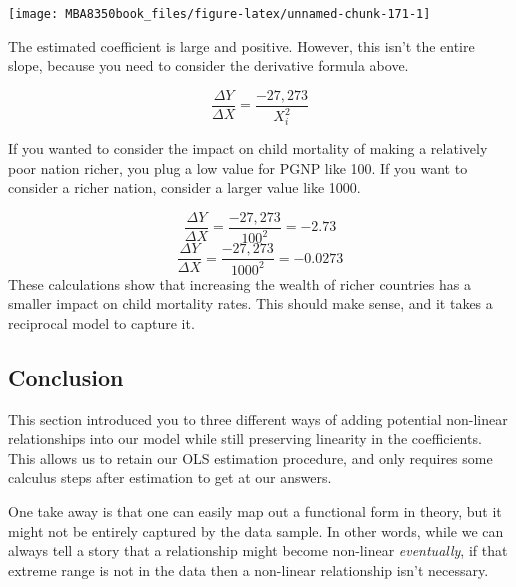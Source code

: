 \documentclass[
]{book}
\newenvironment{Shaded}{\begin{snugshade}}{\end{snugshade}}
\newcommand{\AttributeTok}[1]{\textcolor[rgb]{0.77,0.63,0.00}{#1}}
\newcommand{\FunctionTok}[1]{\textcolor[rgb]{0.00,0.00,0.00}{#1}}
\newcommand{\NormalTok}[1]{#1}
\newcommand{\SpecialCharTok}[1]{\textcolor[rgb]{0.00,0.00,0.00}{#1}}
\newcommand{\StringTok}[1]{\textcolor[rgb]{0.31,0.60,0.02}{#1}}
\begin{document}
\begin{Shaded}
\end{Shaded}

\begin{center}\texttt{[image: MBA8350book\_files/figure-latex/unnamed-chunk-171-1]} \end{center}

The estimated coefficient is large and positive. However, this isn't the entire slope, because you need to consider the derivative formula above.

\[\frac{\Delta Y}{\Delta X} = \frac{-27,273} {X_i^{2}}\]

If you wanted to consider the impact on child mortality of making a relatively poor nation richer, you plug a low value for PGNP like 100. If you want to consider a richer nation, consider a larger value like 1000.

\[\frac{\Delta Y}{\Delta X} = \frac{-27,273} {100^{2}} = -2.73\]
\[\frac{\Delta Y}{\Delta X} = \frac{-27,273} {1000^{2}} = -0.0273\]
These calculations show that increasing the wealth of richer countries has a smaller impact on child mortality rates. This should make sense, and it takes a reciprocal model to capture it.

\hypertarget{conclusion}{%
\subsection{Conclusion}\label{conclusion}}

This section introduced you to three different ways of adding potential non-linear relationships into our model while still preserving linearity in the coefficients. This allows us to retain our OLS estimation procedure, and only requires some calculus steps after estimation to get at our answers.

One take away is that one can easily map out a functional form in theory, but it might not be entirely captured by the data sample. In other words, while we can always tell a story that a relationship might become non-linear \emph{eventually}, if that extreme range is not in the data then a non-linear relationship isn't necessary.
\end{document}
